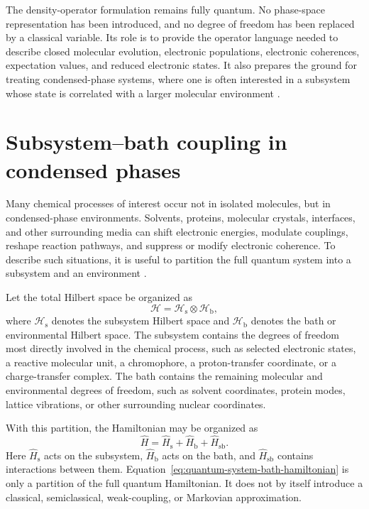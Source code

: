 \documentclass[
  11pt,
  letterpaper,
  onehalfspacing,
  normalmargins,
  equalmargins,
  oneside
]{ut-thesis}
\begin{document}
The density-operator formulation remains fully quantum. No phase-space
representation has been introduced, and no degree of freedom has been replaced
by a classical variable. Its role is to provide the operator language needed to
describe closed molecular evolution, electronic populations, electronic
coherences, expectation values, and reduced electronic states. It also prepares
the ground for treating condensed-phase systems, where one is often interested
in a subsystem whose state is correlated with a larger molecular environment
\cite{Blum2012,BreuerPetruccione2002}.

\section{Subsystem--bath coupling in condensed phases}
\label{sec:condensed-phase-subsystem-bath}

Many chemical processes of interest occur not in isolated molecules, but in
condensed-phase environments. Solvents, proteins, molecular crystals,
interfaces, and other surrounding media can shift electronic energies,
modulate couplings, reshape reaction pathways, and suppress or modify
electronic coherence. To describe such situations, it is useful to partition
the full quantum system into a subsystem and an environment
\cite{Nitzan2006,MayKuhn2011,BreuerPetruccione2002}.

Let the total Hilbert space be organized as
\begin{equation}
\mathcal H
=
\mathcal H_{\mathrm s}
\otimes
\mathcal H_{\mathrm b},
\label{eq:system-bath-hilbert-space}
\end{equation}
where \(\mathcal H_{\mathrm s}\) denotes the subsystem Hilbert space and
\(\mathcal H_{\mathrm b}\) denotes the bath or environmental Hilbert space.
The subsystem contains the degrees of freedom most directly involved in the
chemical process, such as selected electronic states, a reactive molecular
unit, a chromophore, a proton-transfer coordinate, or a charge-transfer
complex. The bath contains the remaining molecular and environmental degrees
of freedom, such as solvent coordinates, protein modes, lattice vibrations, or
other surrounding nuclear coordinates.

With this partition, the Hamiltonian may be organized as
\begin{equation}
\hat H
=
\hat H_{\mathrm s}
+
\hat H_{\mathrm b}
+
\hat H_{\mathrm{sb}} .
\label{eq:quantum-system-bath-hamiltonian}
\end{equation}
Here \(\hat H_{\mathrm s}\) acts on the subsystem, \(\hat H_{\mathrm b}\) acts
on the bath, and \(\hat H_{\mathrm{sb}}\) contains interactions between them.
Equation~\eqref{eq:quantum-system-bath-hamiltonian} is only a partition of the
full quantum Hamiltonian. It does not by itself introduce a classical,
semiclassical, weak-coupling, or Markovian approximation.
\end{document}

